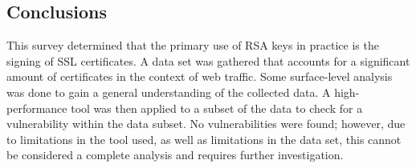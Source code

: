\documentclass[12pt]{ucthesis}
\begin{document}
%
%
%
\subsection{Conclusions}
\label{subsec:conc}
This survey determined that the primary use of RSA keys in practice is the
signing of SSL certificates. A data set was gathered that accounts for a
significant amount of certificates in the context of web traffic. Some
surface-level analysis was done to gain a general understanding of the
collected data. A high-performance tool was then applied to a subset of the
data to check for a vulnerability within the data subset. No vulnerabilities
were found; however, due to limitations in the tool used, as well as
limitations in the data set, this cannot be considered a complete analysis
and requires further investigation.
\end{document}
